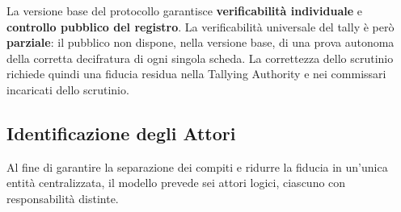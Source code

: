 \documentclass[12pt,a4paper]{article}
\begin{document}
La versione base del protocollo garantisce \textbf{verificabilit\`a individuale} e \textbf{controllo pubblico del registro}. La verificabilit\`a universale del tally \`e per\`o \textbf{parziale}: il pubblico non dispone, nella versione base, di una prova autonoma della corretta decifratura di ogni singola scheda. La correttezza dello scrutinio richiede quindi una fiducia residua nella Tallying Authority e nei commissari incaricati dello scrutinio.

\subsection{Identificazione degli Attori}

Al fine di garantire la separazione dei compiti e ridurre la fiducia in un'unica entit\`a centralizzata, il modello prevede sei attori logici, ciascuno con responsabilit\`a distinte.
\end{document}
